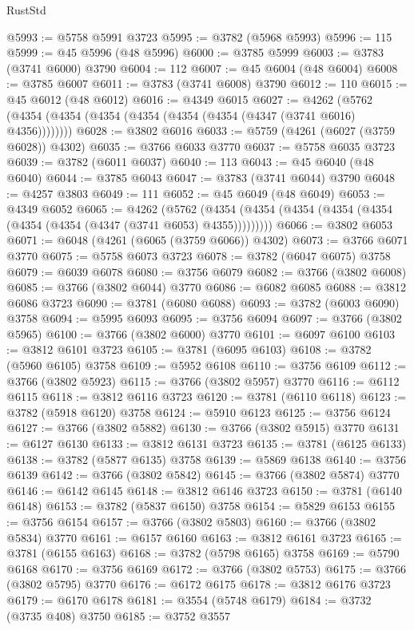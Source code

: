 \begin{lexlean}{RustStd}
\begin{coremodule}
@5993 := @5758 @5991 @3723
@5995 := @3782 (@5968 @5993)
@5996 := 115
@5999 := @45 @5996 (@48 @5996)
@6000 := @3785 @5999
@6003 := @3783 (@3741 @6000) @3790
@6004 := 112
@6007 := @45 @6004 (@48 @6004)
@6008 := @3785 @6007
@6011 := @3783 (@3741 @6008) @3790
@6012 := 110
@6015 := @45 @6012 (@48 @6012)
@6016 := @4349 @6015
@6027 := @4262 (@5762 (@4354 (@4354 (@4354 (@4354 (@4354 (@4354 (@4347 (@3741 @6016) @4356))))))))
@6028 := @3802 @6016
@6033 := @5759 (@4261 (@6027 (@3759 @6028)) @4302)
@6035 := @3766 @6033 @3770
@6037 := @5758 @6035 @3723
@6039 := @3782 (@6011 @6037)
@6040 := 113
@6043 := @45 @6040 (@48 @6040)
@6044 := @3785 @6043
@6047 := @3783 (@3741 @6044) @3790
@6048 := @4257 @3803
@6049 := 111
@6052 := @45 @6049 (@48 @6049)
@6053 := @4349 @6052
@6065 := @4262
    (@5762 (@4354 (@4354 (@4354 (@4354 (@4354 (@4354 (@4354 (@4347 (@3741 @6053) @4355)))))))))
@6066 := @3802 @6053
@6071 := @6048 (@4261 (@6065 (@3759 @6066)) @4302)
@6073 := @3766 @6071 @3770
@6075 := @5758 @6073 @3723
@6078 := @3782 (@6047 @6075) @3758
@6079 := @6039 @6078
@6080 := @3756 @6079
@6082 := @3766 (@3802 @6008)
@6085 := @3766 (@3802 @6044) @3770
@6086 := @6082 @6085
@6088 := @3812 @6086 @3723
@6090 := @3781 (@6080 @6088)
@6093 := @3782 (@6003 @6090) @3758
@6094 := @5995 @6093
@6095 := @3756 @6094
@6097 := @3766 (@3802 @5965)
@6100 := @3766 (@3802 @6000) @3770
@6101 := @6097 @6100
@6103 := @3812 @6101 @3723
@6105 := @3781 (@6095 @6103)
@6108 := @3782 (@5960 @6105) @3758
@6109 := @5952 @6108
@6110 := @3756 @6109
@6112 := @3766 (@3802 @5923)
@6115 := @3766 (@3802 @5957) @3770
@6116 := @6112 @6115
@6118 := @3812 @6116 @3723
@6120 := @3781 (@6110 @6118)
@6123 := @3782 (@5918 @6120) @3758
@6124 := @5910 @6123
@6125 := @3756 @6124
@6127 := @3766 (@3802 @5882)
@6130 := @3766 (@3802 @5915) @3770
@6131 := @6127 @6130
@6133 := @3812 @6131 @3723
@6135 := @3781 (@6125 @6133)
@6138 := @3782 (@5877 @6135) @3758
@6139 := @5869 @6138
@6140 := @3756 @6139
@6142 := @3766 (@3802 @5842)
@6145 := @3766 (@3802 @5874) @3770
@6146 := @6142 @6145
@6148 := @3812 @6146 @3723
@6150 := @3781 (@6140 @6148)
@6153 := @3782 (@5837 @6150) @3758
@6154 := @5829 @6153
@6155 := @3756 @6154
@6157 := @3766 (@3802 @5803)
@6160 := @3766 (@3802 @5834) @3770
@6161 := @6157 @6160
@6163 := @3812 @6161 @3723
@6165 := @3781 (@6155 @6163)
@6168 := @3782 (@5798 @6165) @3758
@6169 := @5790 @6168
@6170 := @3756 @6169
@6172 := @3766 (@3802 @5753)
@6175 := @3766 (@3802 @5795) @3770
@6176 := @6172 @6175
@6178 := @3812 @6176 @3723
@6179 := @6170 @6178
@6181 := @3554 (@5748 @6179)
@6184 := @3732 (@3735 @408) @3750
@6185 := @3752 @3557

\end{coremodule}
\end{lexlean}
